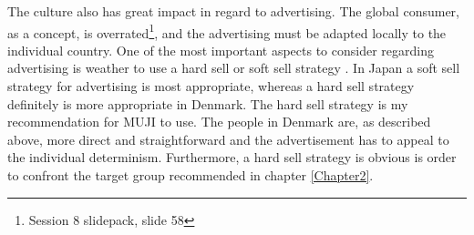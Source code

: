 The culture also has great impact in regard to advertising. The global consumer, as a concept, is overrated\footnote{Session 8 slidepack, slide 58}, and the advertising must be adapted locally to the individual country. One of the most important aspects to consider regarding advertising is weather to use a hard sell or soft sell strategy \cite{Sell}. In Japan a soft sell strategy for advertising is most appropriate, whereas a hard sell strategy definitely is more appropriate in Denmark. The hard sell strategy is my recommendation for MUJI to use. The people in Denmark are, as described above, more direct and straightforward and the advertisement has to appeal to the individual determinism. Furthermore, a hard sell strategy is obvious is order to confront the target group recommended in chapter \ref{Chapter2}.  